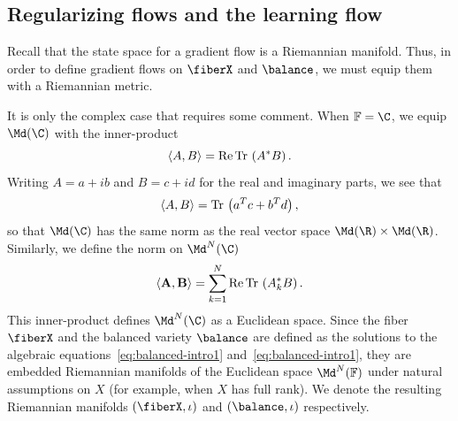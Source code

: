 

\subsection{Regularizing flows and the learning flow}
\label{subsec:reg-flow}
Recall that the state space for a gradient flow is a Riemannian manifold. Thus, in order to define gradient flows on $\fiberX$ and $\balance$, we must equip them with a Riemannian metric. 

It is only the complex case that requires some comment. When $\mathbb{F}=\C$, we equip $\Md(\C)$ with the inner-product
\begin{equation}
    \label{eq:ipc-1}
    \langle A,B  \rangle =  \mathrm{Re}\,\mathrm{Tr}\, \left( A^* B\right).
\end{equation}
Writing $A=a+ib$ and $B=c+id$ for the real and imaginary parts, we see that 
\begin{equation}
    \label{eq:ipc-2}
    \langle A, B \rangle =  \mathrm{Tr}\, \left( a^Tc+ b^Td\right),
\end{equation}
so that $\Md(\C)$ has the same norm as the real vector space $\Md(\R)\times \Md(\R)$. Similarly, we define the norm on $\Md^N(\C)$
\begin{equation}
    \label{eq:ipc}
    \langle \mathbf{A}, \mathbf{B} \rangle = \sum_{k=1}^N \mathrm{Re}\,\mathrm{Tr}\, \left( A_k^* B\right).
\end{equation}
This inner-product defines $\Md^N(\C)$ as a Euclidean space. Since the fiber $\fiberX$ and the balanced variety $\balance$ are defined as the solutions to the algebraic equations~\eqref{eq:balanced-intro1} and~\eqref{eq:balanced-intro1}, they are embedded Riemannian manifolds of the Euclidean space $\Md^N(\mathbb{F})$ under natural assumptions on $X$ (for example, when $X$ has full rank). We denote the resulting Riemannian manifolds $(\fiberX,\iota)$ and $(\balance,\iota)$ respectively. 


